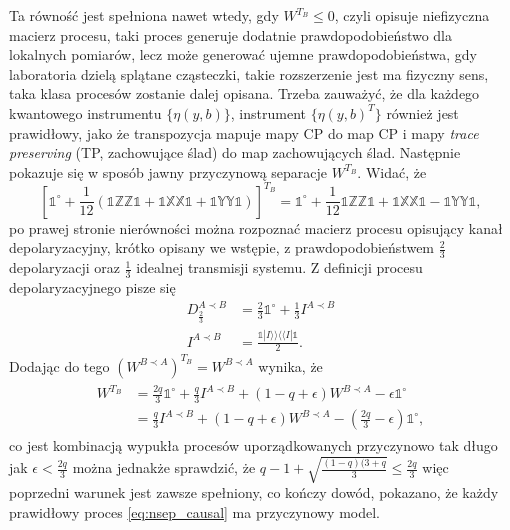 \documentclass[10pt]{article} %
\newcommand{\BBra}[1]{\langle\langle#1|}
\newcommand{\KKet}[1]{|#1\rangle\rangle}
\newcommand{\X}{\mathbb{X}}
\newcommand{\Y}{\mathbb{Y}}
\newcommand{\Z}{\mathbb{Z}}
\newcommand{\I}{\mathbb{1}}
\newcommand{\IO}{\mathbb{1}^\circ}
\begin{document}
Ta równość jest spełniona nawet wtedy, gdy $W^{T_B} \leq 0$, czyli opisuje niefizyczna macierz procesu, taki proces generuje dodatnie prawdopodobieństwo dla lokalnych pomiarów, lecz może generować ujemne prawdopodobieństwa, gdy laboratoria dzielą splątane cząsteczki, takie rozszerzenie jest ma fizyczny sens, taka klasa procesów zostanie dalej opisana. Trzeba zauważyć, że dla każdego kwantowego instrumentu $\{ \eta(y,b) \}$, instrument $\{ \eta(y,b)^T \}$ również jest prawidłowy, jako że transpozycja mapuje mapy CP do map CP i mapy \textit{trace preserving} (TP, zachowujące ślad) do map zachowujących ślad. Następnie pokazuje się w sposób jawny przyczynową
separacje $W^{T_B}$. Widać, że 
\begin{equation}
\left[\IO + \frac{1}{12}\left(\I\Z\Z\I + \I\X\X\I + \I\Y\Y\I\right)\right]^{T_B} = \IO + \frac{1}{12}\I\Z\Z\I + \I\X\X\I - \I\Y\Y\I, 
\end{equation}
po prawej stronie nierówności można rozpoznać macierz procesu opisujący kanał depolaryzacyjny, krótko opisany we wstępie, z prawdopodobieństwem $\frac{2}{3}$ depolaryzacji oraz $\frac{1}{3}$ idealnej transmisji systemu.
Z definicji procesu depolaryzacyjnego pisze się
\begin{align}
D^{A \prec B}_{\frac{2}{3}} &= \frac{2}{3} \IO + \frac{1}{3}I^{A \prec B}  \\
I^{A \prec B} &= \frac{\I\KKet{I}\BBra{I}\I}{2}.
\end{align} Dodając do tego $\left(W^{B \prec A}\right)^{T_B} = W^{B \prec A}$
wynika, że 
\begin{align}
\label{eq:wtb_sep}
\begin{split}
W^{T_B} &= \frac{2q}{3}\IO + \frac{q}{3} I^{A \prec B} + (1-q+\epsilon)W^{B \prec A} - \epsilon \IO \\
 &= \frac{q}{3} I^{A \prec B} + (1-q+\epsilon) W^{B \prec A} - (\frac{2q}{3} - \epsilon) \IO,
\end{split}
\end{align} co jest kombinacją wypukła procesów uporządkowanych przyczynowo tak długo jak $\epsilon < \frac{2q}{3}$ można jednakże sprawdzić, że $q - 1 + \sqrt{\frac{(1-q)(3+q}{3}} \leq \frac{2q}{3}$ więc poprzedni warunek jest zawsze spełniony, co kończy dowód, pokazano, że każdy prawidłowy proces \eqref{eq:nsep_causal} ma przyczynowy model.
\end{document}
